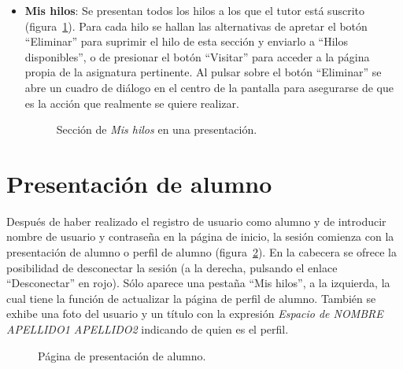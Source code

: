 \documentclass[a4paper, 12pt]{book}
\begin{document}
\begin{itemize}
  \item {\bfseries Mis hilos}: Se presentan todos los hilos a los que el tutor est\'a suscrito (figura~\ref{figura:tutor3}). Para cada hilo se hallan las 
  alternativas de apretar el bot\'on ``Eliminar'' para suprimir el hilo de esta secci\'on y enviarlo a ``Hilos disponibles'', o de presionar el bot\'on
  ``Visitar'' para acceder a la p\'agina propia de la asignatura pertinente. Al pulsar sobre el bot\'on ``Eliminar'' se abre un cuadro de di\'alogo en el 
  centro de la pantalla para asegurarse de que es la acci\'on que realmente se quiere realizar.
  \begin{figure}[htbp] 
    \centering
    \caption{Secci\'on de \textit{Mis hilos} en una presentaci\'on.}
    \label{figura:tutor3}
  \end{figure}
\end{itemize} 


\section{Presentaci\'on de alumno}
\label{app:presentacionalumno}
Despu\'es de haber realizado el registro de usuario como alumno y de introducir nombre de usuario y contrase\~na en la p\'agina de inicio, la sesi\'on 
comienza con la presentaci\'on de alumno o perfil de alumno (figura~\ref{figura:alumno}). En la cabecera se ofrece la posibilidad de desconectar la sesi\'on 
(a la derecha, pulsando el enlace ``Desconectar'' en rojo). S\'olo aparece una pesta\~na ``Mis hilos'', a la izquierda, la cual tiene la funci\'on de 
actualizar la p\'agina de perfil de alumno. Tambi\'en se exhibe una foto del usuario y un t\'itulo con la expresi\'on 
\textit{Espacio de NOMBRE APELLIDO1 APELLIDO2} indicando de quien es el perfil.

\begin{figure}[htbp] 
  \centering
  \caption{P\'agina de presentaci\'on de alumno.}
  \label{figura:alumno}
\end{figure}
\end{document}
